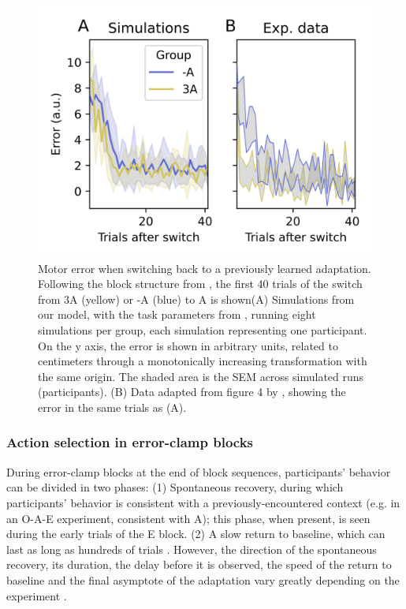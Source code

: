 \documentclass[a4paper,doc,floatsintext,natbib]{apa6}%
\begin{document}
\begin{figure}
\centering
\includegraphics{./figures/figure_3.png}
\caption{Motor error when switching back to a previously learned adaptation. Following the block structure from \cite{Davidson_Scaling_2004}, the first 40 trials of the switch from 3A (yellow) or -A (blue) to A is shown(A) Simulations from our model, with the task parameters from \cite{Davidson_Scaling_2004}, running eight simulations per group, each simulation representing one participant. On the y axis, the error is shown in arbitrary units, related to centimeters through a monotonically increasing transformation with the same origin. The shaded area is the SEM across simulated runs (participants). (B) Data adapted from figure 4 by \cite{Davidson_Scaling_2004}, showing the error in the same trials as (A).}
\label{fig:davidson-2004}
\end{figure}

\subsubsection{Action selection in error-clamp blocks}
During error-clamp blocks at the end of block sequences, participants' behavior can be divided in two phases: (1) Spontaneous recovery, during which participants' behavior is consistent with a previously-encountered context (e.g. in an O-A-E experiment, consistent with A); this phase, when present, is seen during the early trials of the E block. (2) A slow return to baseline, which can last as long as hundreds of trials \citep{Brennan_Decay_2015}. However, the direction of the spontaneous recovery, its duration, the delay before it is observed, the speed of the return to baseline and the final asymptote of the adaptation vary greatly depending on the experiment \citep{Brennan_Decay_2015,Vaswani_Decay_2013,Smith_Interacting_2006,Shmuelof_Overcoming_2012}.
\end{document}
